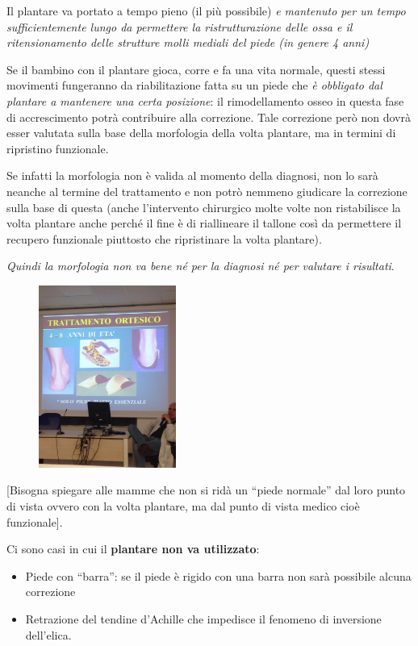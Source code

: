 Il plantare va portato a tempo pieno (il più possibile) \emph{e mantenuto per un tempo sufficientemente lungo da permettere la ristrutturazione delle ossa e il ritensionamento delle strutture molli mediali del piede (in genere 4 anni)}

Se il bambino con il plantare gioca, corre e fa una vita normale, questi stessi movimenti fungeranno da riabilitazione fatta su un piede che \emph{è obbligato dal plantare a mantenere una certa posizione}: il rimodellamento osseo in questa fase di accrescimento potrà contribuire alla correzione. Tale correzione però non dovrà esser valutata sulla base della morfologia della volta plantare, ma in termini di ripristino funzionale.

Se infatti la morfologia non è valida al momento della diagnosi, non lo sarà neanche al termine del trattamento e non potrò nemmeno giudicare la correzione sulla base di questa (anche l'intervento chirurgico molte volte non ristabilisce la volta plantare anche perché il fine è di
riallineare il tallone così da permettere il recupero funzionale piuttosto che ripristinare la volta plantare).

\emph{Quindi la morfologia non va bene né per la diagnosi né per valutare i risultati}.

\begin{figure}[!ht]
\centering
\includegraphics[width=0.4\textwidth]{015/image4.jpeg}
\end{figure}


{[}Bisogna spiegare alle mamme che non si ridà un ``piede normale'' dal loro punto di vista ovvero con la volta plantare, ma dal punto di vista medico cioè funzionale{]}.

Ci sono casi in cui il \textbf{plantare non va utilizzato}:

\begin{itemize}
\item
  Piede con ``barra'': se il piede è rigido con una barra non sarà possibile alcuna correzione
\item
  Retrazione del tendine d'Achille che impedisce il fenomeno di inversione dell'elica.
\end{itemize}

